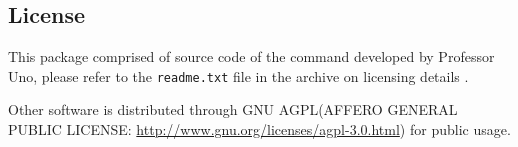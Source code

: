 \subsection{License}
This package comprised of source code of the command developed by Professor Uno, please refer to the \verb|readme.txt| file in the archive on licensing details \cite{UnoWeb}.  

Other software is distributed through GNU AGPL(AFFERO GENERAL PUBLIC LICENSE: \url{http://www.gnu.org/licenses/agpl-3.0.html}) for public usage.
 

